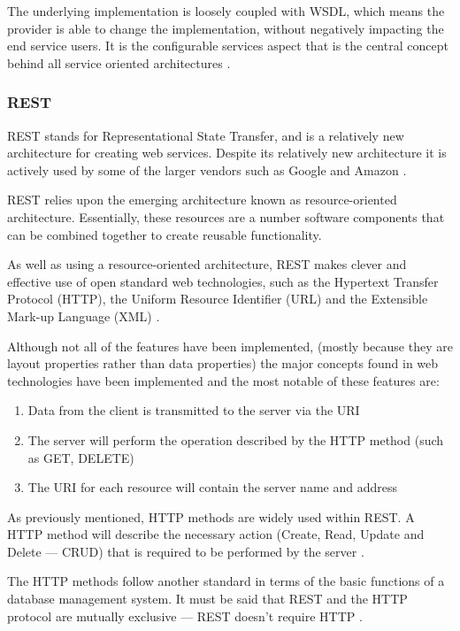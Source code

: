The underlying implementation is loosely coupled with WSDL, which means the 
provider is able to change the implementation, without negatively impacting 
the end service users. It is the configurable services aspect that is the 
central concept behind all service oriented architectures \citep{gershon04}. 


\subsubsection{REST}

REST stands for Representational State Transfer, and is a relatively new 
architecture for creating web services. Despite its relatively new architecture
it is actively used by some of the larger vendors such as Google and Amazon 
\citep{dospinescu13}.

REST relies upon the emerging architecture known as resource-oriented 
architecture. Essentially, these resources are a number software components 
that can be combined together to create reusable functionality.

As well as using a resource-oriented architecture, REST makes clever and 
effective use of open standard web technologies, such as the Hypertext Transfer
Protocol (HTTP), the Uniform Resource Identifier (URL) and the Extensible 
Mark-up Language (XML) \citep{dospinescu13}.

Although not all of the features have been implemented, (mostly because they 
are layout properties rather than data properties) the major concepts found in
web technologies have been implemented and the most notable of these features 
are:

\begin{enumerate}
  \item Data from the client is transmitted to the server via the URI
  \item The server will perform the operation described by the HTTP method 
  (such as GET, DELETE)
  \item The URI for each resource will contain the server name and address
\end{enumerate}

As previously mentioned, HTTP methods are widely used within REST. A HTTP 
method will describe the necessary action (Create, Read, Update and Delete --- 
CRUD) that is required to be performed by the server \citep{dospinescu13}.

The HTTP methods follow another standard in terms of the basic functions of a 
database management system. It must be said that REST and the HTTP protocol are
mutually exclusive --- REST doesn't require HTTP \citep{dospinescu13}. 

